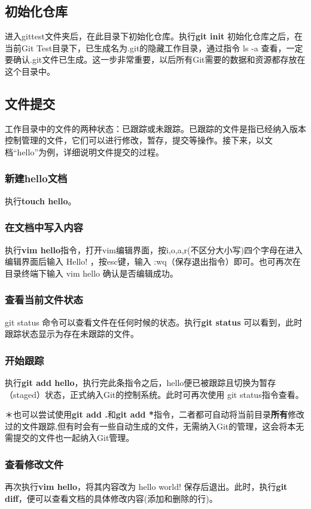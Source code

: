 \documentclass{article}
\begin{document}
\subsection{初始化仓库}
进入gittest文件夹后，在此目录下初始化仓库。执行\textbf{git init} 初始化仓库之后，在当前Git Test目录下，已生成名为.git的隐藏工作目录，通过指令 ls -a 查看，一定要确认.git文件已生成。这一步非常重要，以后所有Git需要的数据和资源都存放在这个目录中。

\subsection{文件提交}
工作目录中的文件的两种状态：已跟踪或未跟踪。已跟踪的文件是指已经纳入版本控制管理的文件，它们可以进行修改，暂存，提交等操作。接下来，以文档“hello”为例，详细说明文件提交的过程。
\subsubsection{新建hello文档}
执行\textbf{touch hello}。
\subsubsection{在文档中写入内容}
执行\textbf{vim hello}指令，打开vim编辑界面，按i,o,a,r(不区分大小写)四个字母在进入编辑界面后输入 Hello! ，按esc键，输入 :wq（保存退出指令）即可。也可再次在目录终端下输入 vim hello 确认是否编辑成功。
\subsubsection{查看当前文件状态}
git status 命令可以查看文件在任何时候的状态。执行\textbf{git status} 可以看到，此时跟踪状态显示为存在未跟踪的文件。



\subsubsection{开始跟踪}
执行\textbf{git add hello}，执行完此条指令之后，hello便已被跟踪且切换为暂存（staged）状态，正式纳入Git的控制系统。此时可再次使用 git status指令查看。

＊也可以尝试使用\textbf{git add .}和\textbf{git add  *}指令，二者都可自动将当前目录\textbf{所有}修改过的文件跟踪,但有时会有一些自动生成的文件，无需纳入Git的管理，这会将本无需提交的文件也一起纳入Git管理。



\subsubsection{查看修改文件}
再次执行\textbf{vim hello}，将其内容改为 hello world! 保存后退出。此时，执行\textbf{git diff}，便可以查看文档的具体修改内容(添加和删除的行)。
\end{document}
